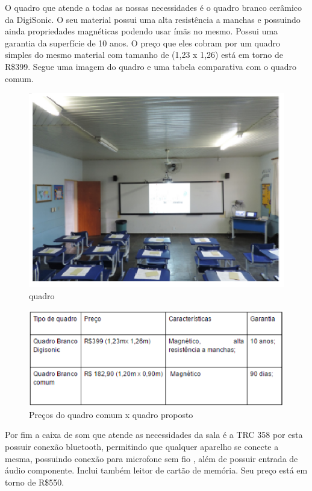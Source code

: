 O quadro que atende a todas as nossas necessidades é o quadro branco cerâmico da DigiSonic. O seu material possui uma alta resistência a manchas e possuindo ainda propriedades magnéticas podendo usar ímãs no mesmo. Possui uma garantia da superfície de 10 anos. O preço que eles cobram por um quadro simples do mesmo material com tamanho de (1,23 x 1,26) está em torno de R\$399. Segue uma imagem do quadro e uma tabela comparativa com o quadro comum.

\begin{figure}[!h]
\centering
\includegraphics[keepaspectratio=true,scale=1]{figuras/quadro.eps}
\caption{quadro}
\end{figure}

\begin{figure}[!h]
\centering
\includegraphics[keepaspectratio=true,scale=1]{figuras/comparativo_precos_quadros.eps}
\caption{Preços do quadro comum x quadro proposto}
\end{figure}

Por fim a caixa de som que atende as necessidades da sala é a TRC 358 por esta possuir conexão bluetooth, permitindo que qualquer aparelho se conecte a mesma, possuindo conexão para microfone sem fio , além de possuir entrada de áudio componente. Inclui também leitor de cartão de memória. Seu preço está em torno de R\$550.


